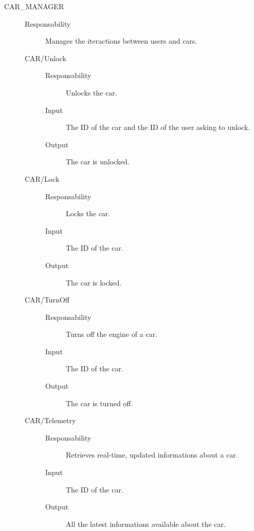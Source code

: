 \documentclass[11pt]{article} %
\begin{document}
\begin{description}
	\item[CAR\_MANAGER] \hfill
	\begin{description}
		\item[Responsability] Manages the iteractions between users and cars.
	\item[CAR/Unlock] \hfill
		\begin{description}
			\item[Responsability] Unlocks the car.
			\item[Input] The ID of the car and the ID of the user asking to unlock.
			\item[Output] The car is unlocked.
		\end{description}
	\item[CAR/Lock] \hfill
		\begin{description}
			\item[Responsability] Locks the car.
			\item[Input] The ID of the car.
			\item[Output] The car is locked.
		\end{description}
	\item[CAR/TurnOff] \hfill
		\begin{description}
			\item[Responsability] Turns off the engine of a car.
			\item[Input] The ID of the car.
			\item[Output] The car is turned off.
		\end{description}
	\item[CAR/Telemetry] \hfill
		\begin{description}
			\item[Responsability] Retrieves real-time, updated informations about a car.
			\item[Input] The ID of the car.
			\item[Output] All the latest informations available about the car.
		\end{description}
	\end{description}


\end{description}
\end{document}
